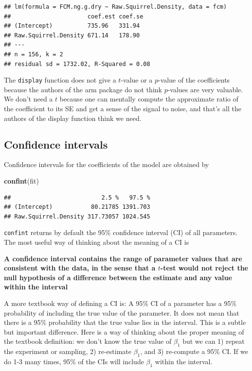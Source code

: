 \documentclass[]{book}
\newenvironment{Shaded}{\begin{snugshade}}{\end{snugshade}}
\newcommand{\KeywordTok}[1]{\textcolor[rgb]{0.13,0.29,0.53}{\textbf{#1}}}
\newcommand{\NormalTok}[1]{#1}
\begin{document}
\begin{verbatim}
## lm(formula = FCM.ng.g.dry ~ Raw.Squirrel.Density, data = fcm)
##                      coef.est coef.se
## (Intercept)          735.96   331.94 
## Raw.Squirrel.Density 671.14   178.90 
## ---
## n = 156, k = 2
## residual sd = 1732.02, R-Squared = 0.08
\end{verbatim}

The \texttt{display} function does not give a \(t\)-value or a
\(p\)-value of the coefficients because the authors of the arm package
do not think \(p\)-values are very valuable. We don't need a \(t\)
because one can mentally compute the approximate ratio of the
coefficient to its SE and get a sense of the signal to noise, and that's
all the authors of the display function think we need.

\subsection{Confidence intervals}\label{confidence-intervals}

Confidence intervals for the coefficients of the model are obtained by

\begin{Shaded}
\begin{Highlighting}[]
\KeywordTok{confint}\NormalTok{(fit)}
\end{Highlighting}
\end{Shaded}

\begin{verbatim}
##                          2.5 %   97.5 %
## (Intercept)           80.21785 1391.703
## Raw.Squirrel.Density 317.73057 1024.545
\end{verbatim}

\texttt{confint} returns by default the 95\% confidence interval (CI) of
all parameters. The most useful way of thinking about the meaning of a
CI is

\textbf{A confidence interval contains the range of parameter values
that are consistent with the data, in the sense that a \(t\)-test would
not reject the null hypothesis of a difference between the estimate and
any value within the interval}

A more textbook way of defining a CI is: A 95\% CI of a parameter has a
95\% probability of including the true value of the parameter. It does
not mean that there is a 95\% probability that the true value lies in
the interval. This is a subtle but important difference. Here is a way
of thinking about the proper meaning of the textbook definition: we
don't know the true value of \(\beta_1\) but we can 1) repeat the
experiment or sampling, 2) re-estimate \(\beta_1\), and 3) re-compute a
95\% CI. If we do 1-3 many times, 95\% of the CIs will include
\(\beta_1\) within the interval.
\end{document}
